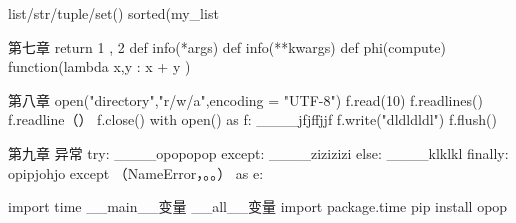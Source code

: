 list/str/tuple/set()  %
sorted(my_list%

第七章  
return 1 , 2
def info(*args) %
def info(**kwargs)  %
def phi(compute)   %
function(lambda x,y : x + y )  %

第八章
open("directory","r/w/a",encoding = "UTF-8")  %
f.read(10)  %
f.readlines()  %
f.readline（）  %
f.close()
with open() as f:  %
____jfjffjjf  
f.write("dldldldl")  %
f.flush()   %

第九章  异常
try:
____opopopop
except:
____zizizizi
else:
____klklkl
finally:
opipjohjo
except （NameError，。。） as e:  %

import time  %
__main__变量  %
__all__变量   %
import package.time
pip install opop 




